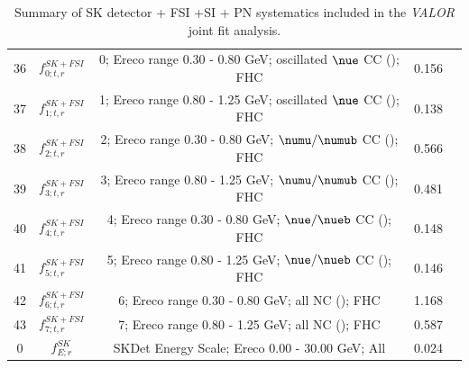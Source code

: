 {\begin{table}
\begin{tabular}{| c | c | c | c | c |}
36     &  $f_{0; t, r}^{SK+FSI}$  &  0; Ereco range 0.30 - 0.80 GeV; oscillated \(\nue\)  CC (\nueCConepi{}); FHC & 0.156      \\ 
37     &  $f_{1; t, r}^{SK+FSI}$  &  1; Ereco range 0.80 - 1.25 GeV; oscillated \(\nue\)  CC (\nueCConepi{}); FHC & 0.138      \\ 
38     &  $f_{2; t, r}^{SK+FSI}$  &  2; Ereco range 0.30 - 0.80 GeV; \(\numu/\numub\) CC (\nueCConepi{}); FHC   & 0.566      \\ 
39     &  $f_{3; t, r}^{SK+FSI}$  &  3; Ereco range 0.80 - 1.25 GeV; \(\numu/\numub\) CC (\nueCConepi{}); FHC   & 0.481      \\ 
40     &  $f_{4; t, r}^{SK+FSI}$  &  4; Ereco range 0.30 - 0.80 GeV; \(\nue/\nueb\) CC (\nueCConepi{}); FHC     & 0.148      \\ 
41     &  $f_{5; t, r}^{SK+FSI}$  &  5; Ereco range 0.80 - 1.25 GeV; \(\nue/\nueb\) CC (\nueCConepi{}); FHC     & 0.146      \\ 
42     &  $f_{6; t, r}^{SK+FSI}$  &  6; Ereco range 0.30 - 0.80 GeV; all NC (\nueCConepi{}); FHC            & 1.168      \\ 
43     &  $f_{7; t, r}^{SK+FSI}$  &  7; Ereco range 0.80 - 1.25 GeV; all NC (\nueCConepi{}); FHC            & 0.587      \\ 

\hline

0      &       $f_{E; r}^{SK}$                   & SKDet Energy Scale; Ereco 0.00 - 30.00 GeV; All                                        & 0.024 \\

\hline

\end{tabular}

\caption{
Summary of SK detector + FSI +SI + PN systematics included in the {\em VALOR} joint fit analysis.
    }
\label{tab:banff_uncertainties_skdetfsi}
\end{table}
}

\clearpage

